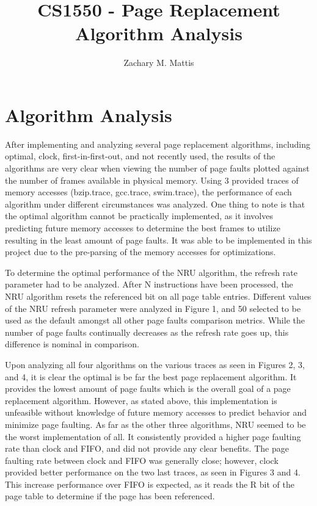 \documentclass[12pt, letterpaper]{report}
\title{CS1550 - Page Replacement Algorithm Analysis}
\author{Zachary M. Mattis}
\begin{document}
	
\maketitle


\section{Algorithm Analysis}

After implementing and analyzing several page replacement algorithms, including optimal, clock, first-in-first-out, and not recently used, the results of the algorithms are very clear when viewing the number of page faults plotted against the number of frames available in physical memory. Using 3 provided traces of memory accesses (bzip.trace, gcc.trace, swim.trace), the performance of each algorithm under different circumstances was analyzed. One thing to note is that the optimal algorithm cannot be practically implemented, as it involves predicting future memory accesses to determine the best frames to utilize resulting in the least amount of page faults. It was able to be implemented in this project due to the pre-parsing of the memory accesses for optimizations.

To determine the optimal performance of the NRU algorithm, the refresh rate parameter had to be analyzed. After N instructions have been processed, the NRU algorithm resets the referenced bit on all page table entries. Different values of the NRU refresh parameter were analyzed in Figure 1, and 50 selected to be used as the default amongst all other page faults comparison metrics. While the number of page faults continually decreases as the refresh rate goes up, this difference is nominal in comparison. 

Upon analyzing all four algorithms on the various traces as seen in Figures 2, 3, and 4, it is clear the optimal is be far the best page replacement algorithm. It provides the lowest amount of page faults which is the overall goal of a page replacement algorithm. However, as stated above, this implementation is unfeasible without knowledge of future memory accesses to predict behavior and minimize page faulting. As far as the other three algorithms, NRU seemed to be the worst implementation of all. It consistently provided a higher page faulting rate than clock and FIFO, and did not provide any clear benefits. The page faulting rate between clock and FIFO was generally close; however, clock provided better performance on the two last traces, as seen in Figures 3 and 4. This increase performance over FIFO is expected, as it reads the R bit of the page table to determine if the page has been referenced.
\end{document}
